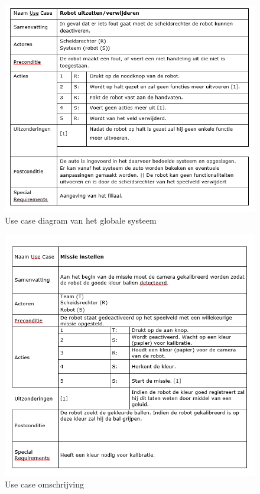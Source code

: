 \documentclass[12pt]{article} %
\begin{document}
\begin{center}
\begin{figure}[H]
\includegraphics[scale=.9]{uc1.png}
\caption{Use case diagram van het globale systeem}
\label{fig:usecase}
\end{figure}
\end{center}

\begin{center}
\begin{figure}
\includegraphics[scale=.9]{uc2.png}
\caption{Use case omschrijving}
\label{fig:usecase}
\end{figure}
\end{center}
\end{document}

